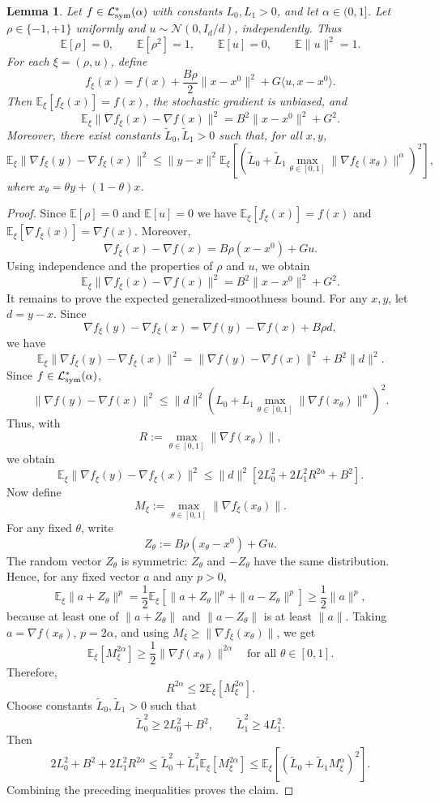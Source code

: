 \documentclass[letter,11pt]{article}
\newtheorem{lemma}[]{Lemma}
\newcommand{\E}{\mathbb{E}}
\begin{document}
\begin{lemma}
\label{lem:exp_scalar_bg0_wrapper}
Let \(f\in\mathcal L_{\rm sym}^*(\alpha)\) with constants \(L_0,L_1>0\), and let \(\alpha\in(0,1]\). Let \(\rho\in\{-1,+1\}\) uniformly and \(u\sim\mathcal N(0,I_d/d)\), independently. Thus
\[
\E[\rho]=0,\qquad \E[\rho^2]=1,\qquad
\E[u]=0,\qquad \E\|u\|^2=1.
\]
For each \(\xi=(\rho,u)\), define
\[
f_\xi(x)
=
f(x)
+
\frac{B\rho}{2}\|x-x^0\|^2
+
G\langle u,x-x^0\rangle.
\]
Then \(\E_\xi[f_\xi(x)]=f(x)\), the stochastic gradient is unbiased, and
\[
\E_\xi\|\nabla f_\xi(x)-\nabla f(x)\|^2
=
B^2\|x-x^0\|^2+G^2.
\]
Moreover, there exist constants \(\widetilde L_0,\widetilde L_1>0\) such that, for all \(x,y\),
\[
\E_\xi\|\nabla f_\xi(y)-\nabla f_\xi(x)\|^2
\le
\|y-x\|^2
\E_\xi\left[
\left(
\widetilde L_0+
\widetilde L_1
\max_{\theta\in[0,1]}
\|\nabla f_\xi(x_\theta)\|^\alpha
\right)^2
\right],
\]
where \(x_\theta=\theta y+(1-\theta)x\).
\end{lemma}

\begin{proof}
Since $\E[\rho]=0$ and $\E[u]=0$ we have $\E_\xi[f_\xi(x)]=f(x)$ and
$\E_\xi[\nabla f_\xi(x)]=\nabla f(x)$. Moreover,
\[
\nabla f_\xi(x)-\nabla f(x)=B\rho(x-x^0)+Gu.
\]
Using independence and the properties of $\rho$ and $u$, we obtain
\[
\E_\xi\|\nabla f_\xi(x)-\nabla f(x)\|^2
=
B^2\|x-x^0\|^2+G^2.
\]
It remains to prove the expected generalized-smoothness bound. For any
$x,y$, let $d=y-x$. Since
\[
\nabla f_\xi(y)-\nabla f_\xi(x)
=
\nabla f(y)-\nabla f(x)+B\rho d,
\]
we have
\[
\E_\xi\|\nabla f_\xi(y)-\nabla f_\xi(x)\|^2
=
\|\nabla f(y)-\nabla f(x)\|^2+B^2\|d\|^2.
\]
Since \(f\in\mathcal L_{\rm sym}^*(\alpha)\),
\[
\|\nabla f(y)-\nabla f(x)\|^2
\le
\|d\|^2
\left(
L_0+
L_1\max_{\theta\in[0,1]}\|\nabla f(x_\theta)\|^\alpha
\right)^2.
\]
Thus, with
\[
R:=\max_{\theta\in[0,1]}\|\nabla f(x_\theta)\|,
\]
we obtain
\[
\E_\xi\|\nabla f_\xi(y)-\nabla f_\xi(x)\|^2
\le
\|d\|^2
\left[
2L_0^2+2L_1^2R^{2\alpha}+B^2
\right].
\]
Now define
\[
M_\xi:=\max_{\theta\in[0,1]}\|\nabla f_\xi(x_\theta)\|.
\]
For any fixed \(\theta\), write
\[
Z_\theta:=B\rho(x_\theta-x^0)+Gu.
\]
The random vector \(Z_\theta\) is symmetric: \(Z_\theta\) and \(-Z_\theta\)
have the same distribution. Hence, for any fixed vector \(a\) and any
\(p>0\),
\[
\E_\xi\|a+Z_\theta\|^p
=
\frac12\E_\xi\left[\|a+Z_\theta\|^p+\|a-Z_\theta\|^p\right]
\ge
\frac12\|a\|^p,
\]
because at least one of \(\|a+Z_\theta\|\) and \(\|a-Z_\theta\|\) is at
least \(\|a\|\). Taking \(a=\nabla f(x_\theta)\), \(p=2\alpha\), and using
\(M_\xi\ge \|\nabla f_\xi(x_\theta)\|\), we get
\[
\E_\xi[M_\xi^{2\alpha}]
\ge
\frac12\|\nabla f(x_\theta)\|^{2\alpha}
\quad\text{for all }\theta\in[0,1].
\]
Therefore,
\[
R^{2\alpha}\le 2\E_\xi[M_\xi^{2\alpha}].
\]
Choose constants \(\widetilde L_0,\widetilde L_1>0\) such that
\[
\widetilde L_0^2\ge 2L_0^2+B^2,
\qquad
\widetilde L_1^2\ge 4L_1^2.
\]
Then
\[
2L_0^2+B^2+2L_1^2R^{2\alpha}
\le
\widetilde L_0^2+\widetilde L_1^2\E_\xi[M_\xi^{2\alpha}]
\le
\E_\xi\left[
\left(
\widetilde L_0+\widetilde L_1M_\xi^\alpha
\right)^2
\right].
\]
Combining the preceding inequalities proves the claim.
\end{proof}
\end{document}
